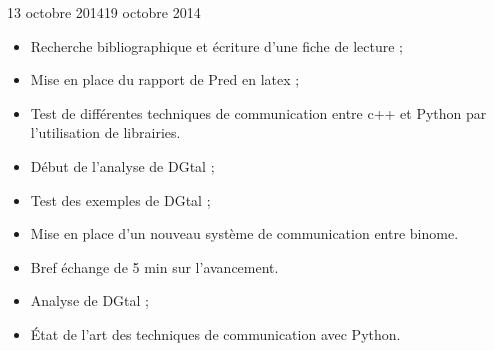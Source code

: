 \documentclass[11pt, french, screen]{report-rd-info}
\begin{document}
\begin{fichesuivi}{13 octobre 2014}{19 octobre 2014}

	\begin{travaileffectue}
    	\begin{itemize}
            \item Recherche bibliographique et écriture d'une fiche de lecture ;
            \item Mise en place du rapport de Pred en latex ;
            \item Test de différentes techniques de communication entre c++ et Python par l'utilisation de librairies.
            \item Début de l'analyse de DGtal ;
            \item Test des exemples de DGtal ;
            \item Mise en place d'un nouveau système de communication entre binome.
        \end{itemize}
	\end{travaileffectue}

	\begin{travailnoneffectue}
	\end{travailnoneffectue}

	\begin{echange}
	    \begin{itemize}
	        \item Bref échange de 5 min sur l'avancement.
	    \end{itemize}
	\end{echange}

	\begin{planification}
	    \begin{itemize}
	        \item Analyse de DGtal ;
            \item État de l'art des techniques de communication avec Python.
        \end{itemize}
	\end{planification}
\end{fichesuivi}
\end{document}
